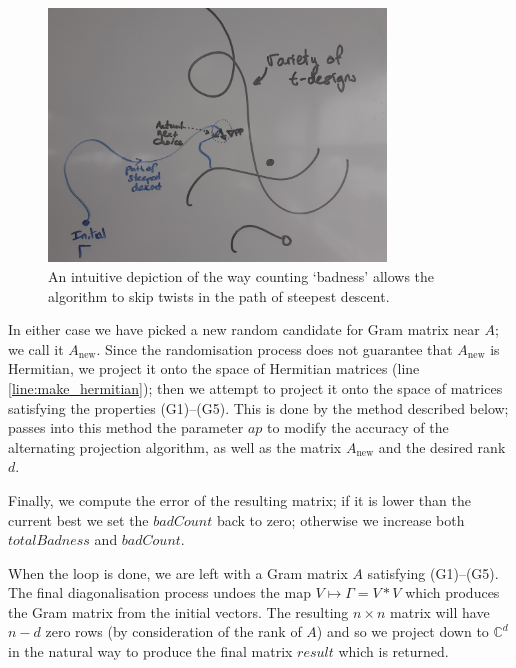 \documentclass{article}
\newcommand{\C}{\mathbb{C}}
\theoremstyle{definition}
\begin{document}
  \begin{figure}
    \centering
    \includegraphics[width=0.8\textwidth]{badness_illustration}
    \caption{An intuitive depiction of the way counting `badness' allows the algorithm to skip twists in the path of steepest descent.\label{fig:badness_illustration}}
  \end{figure}

  
  In either case we have picked a new random candidate for Gram matrix near $ A $; we call it $ A_\mathrm{new} $.
  Since the randomisation process does not guarantee that $ A_\mathrm{new} $ is Hermitian, we project it onto
  the space of Hermitian matrices (line \ref{line:make_hermitian}); then we attempt to project it onto the space
  of matrices satisfying the properties (G1)--(G5). This is done by the method 
  described below;  passes into this method the parameter $ ap $ to modify the accuracy
  of the alternating projection algorithm, as well as the matrix $ A_\mathrm{new} $ and the desired rank $ d $.
  
  Finally, we compute the error of the resulting matrix; if it is lower than the current best we set the $ badCount $
  back to zero; otherwise we increase both $ totalBadness $ and $ badCount $.
  
  When the loop is done, we are left with a Gram matrix $ A $ satisfying (G1)--(G5). The final diagonalisation process
  undoes the map $ V \mapsto \Gamma = V*V $ which produces the Gram matrix from the initial vectors. The resulting
  $ n \times n $ matrix will have $ n - d $ zero rows (by consideration of the rank of $ A $) and so we project down
  to $ \C^d $ in the natural way to produce the final matrix $ result $ which is returned.
  
\end{document}
